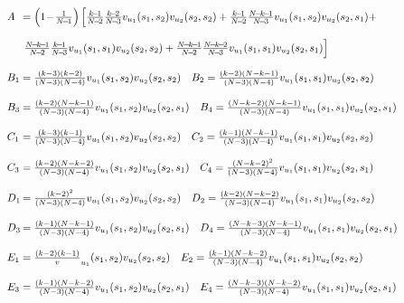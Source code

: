 \documentclass[11pt]{article}
\theoremstyle{plainCl1}
\theoremstyle{plainCl2}
\begin{document}
\begin{equation}
  \resizebox{.9\textwidth}{!}
  {%
$
  \setlength{\arraycolsep}{1pt}
  \begin{array}{llrl}
  A & = \left(1\!-\!\frac{1}{N\!-\!1}\right)  \left[ \frac{k\!-\!1}{N\!-\!2}\frac{k\!-\!2}{N\!-\!3} v_{u_1}(s_1,s_2) v_{u_2}(s_2,s_2) + 
   \frac{k\!-\!1}{N\!-\!2}\frac{N\!-\!k\!-\!1}{N\!-\!3} v_{u_1}(s_1,s_2) v_{u_2}(s_2,s_1) + \right. \\[0.5cm]
   & \left. \frac{N\!-\!k\!-\!1}{N\!-\!2}\frac{k\!-\!1}{N\!-\!3} v_{u_1}(s_1,s_1) v_{u_2}(s_2,s_2) + 
   \frac{N\!-\!k\!-\!1}{N\!-\!2}\frac{N\!-\!k\!-\!2}{N\!-\!3} v_{u_1}(s_1,s_1) v_{u_2}(s_2,s_1)\right] \\[0.5cm] 
   B_1 & = \frac{\left(k - 3\right) \left(k - 2\right)}{(N - 3) (N - 4)} v_{u_1}(s_1,s_2) v_{u_2}(s_2,s_2) \quad
   B_2 = \frac{\left(k - 2\right) \left(N - k - 1\right)}{(N - 3) (N - 4)} v_{u_1}(s_1,s_1) v_{u_2}(s_2,s_2) \\[0.5cm] 
   B_3 & = \frac{\left(k - 2\right) \left(N - k - 1\right)}{(N - 3) (N - 4)} v_{u_1}(s_1,s_2) v_{u_2}(s_2,s_1) \quad
   B_4 = \frac{\left(N - k - 2\right) \left(N - k - 1\right)}{(N - 3) (N - 4)} v_{u_1}(s_1,s_1) v_{u_2}(s_2,s_1) \\[0.5cm] 

   C_1 & = \frac{\left(k - 3\right) \left(k - 1\right)}{(N - 3) (N - 4)} v_{u_1}(s_1,s_2) v_{u_2}(s_2,s_2) \quad
   C_2 = \frac{\left(k - 1\right) \left(N - k - 1\right)}{(N - 3) (N - 4)} v_{u_1}(s_1,s_1) v_{u_2}(s_2,s_2) \\[0.5cm] 
   C_3 & = \frac{\left(k - 2\right) \left(N - k - 2\right)}{(N - 3) (N - 4)} v_{u_1}(s_1,s_2) v_{u_2}(s_2,s_1) \quad
   C_4 = \frac{\left(N - k - 2\right)^{2}}{(N - 3) (N - 4)} v_{u_1}(s_1,s_1) v_{u_2}(s_2,s_1) \\[0.5cm] 

   D_1 & = \frac{\left(k - 2\right)^{2}}{(N - 3) (N - 4)} v_{u_1}(s_1,s_2) v_{u_2}(s_2,s_2) \quad
   D_2 = \frac{\left(k - 2\right) \left(N - k - 2\right)}{(N - 3) (N - 4)} v_{u_1}(s_1,s_1) v_{u_2}(s_2,s_2) \\[0.5cm] 
   D_3 & = \frac{\left(k - 1\right) \left(N - k - 1\right)}{(N - 3) (N - 4)} v_{u_1}(s_1,s_2) v_{u_2}(s_2,s_1) \quad
   D_4 = \frac{\left(N - k - 3\right) \left(N - k - 1\right)}{(N - 3) (N - 4)} v_{u_1}(s_1,s_1) v_{u_2}(s_2,s_1) \\[0.5cm]

   E_1 & = \frac{\left(k - 2\right) \left(k - 1\right)} v_{u_1}(s_1,s_2) v_{u_2}(s_2,s_2) \quad
   E_2 = \frac{\left(k - 1\right) \left(N - k - 2\right)}{(N - 3) (N - 4)} v_{u_1}(s_1,s_1) v_{u_2}(s_2,s_2) \\[0.5cm] 
   E_3 & = \frac{\left(k - 1\right) \left(N - k - 2\right)}{(N - 3) (N - 4)} v_{u_1}(s_1,s_2) v_{u_2}(s_2,s_1) \quad
   E_4 = \frac{\left(N - k - 3\right) \left(N - k - 2\right)}{(N - 3) (N - 4)} v_{u_1}(s_1,s_1) v_{u_2}(s_2,s_1) \\[0.5cm] 
  \end{array}$}
\end{equation}
\end{document}

